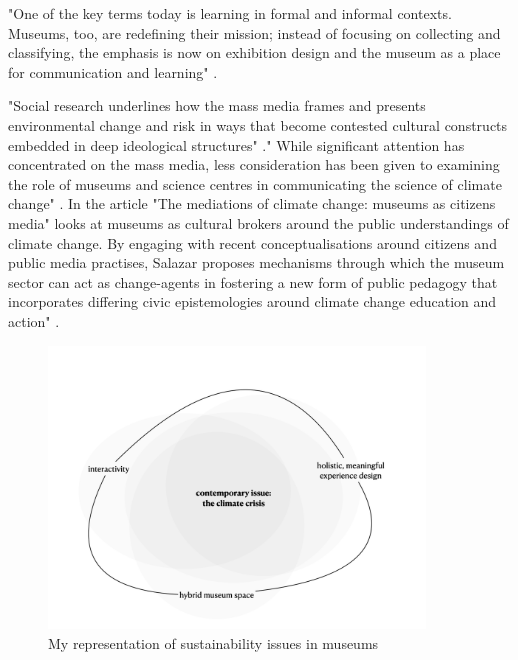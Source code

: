 "One of the key terms today is learning in formal and informal contexts. Museums, too, are redefining their mission; instead of focusing on collecting and classifying, the emphasis is now on exhibition design and the museum as a place for communication and learning" \autocite[p. 8]{insulander_designs_2009}. 


"Social research underlines how the mass media frames and presents environmental change and risk in ways that become contested cultural constructs embedded in deep ideological structures" \autocite[p. 1]{salazar_mediations_2011}." While significant attention has concentrated on the mass media, less consideration has been given to examining the role of museums and science centres in communicating the science of climate change" \autocite[p. 1]{salazar_mediations_2011}. In the article "The mediations of climate change: museums as citizens media" \autocite{salazar_mediations_2011} looks at museums as cultural brokers around the public understandings of climate change. By engaging with recent conceptualisations around citizens and public media practises, Salazar proposes mechanisms through which the museum sector can act as change-agents in fostering a new form of public pedagogy that incorporates differing civic epistemologies around climate change education and action" \autocite[p. 1]{salazar_mediations_2011}.

\begin{figure}[h]
\includegraphics[width=10cm]{pictures/problem_sphere.png}
\caption{My representation of sustainability issues in museums}
\centering
\end{figure}


